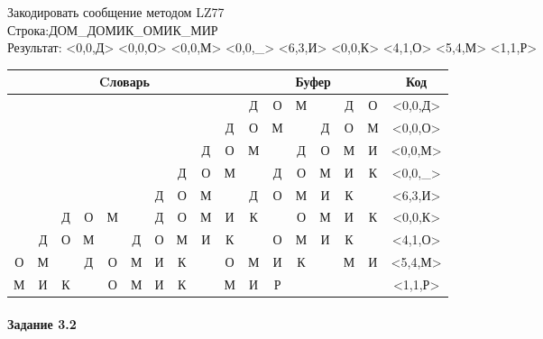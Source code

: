 \documentclass[a4paper, 12pt]{article}
\begin{document}
Закодировать сообщение методом LZ77\\
Строка:ДОМ\_ДОМИК\_ОМИК\_МИР\\
Результат: <0,0,Д> <0,0,О> <0,0,М> <0,0,\_> <6,3,И> <0,0,К> <4,1,О> <5,4,М> <1,1,Р>\\
\begin{table}[h!]
\centering
\begin{tabular}{|c|c|c|c|c|c|c|c|c|c|c|c|c|c|c|c|c|} 
\hline
\multicolumn{10}{|c|}{Cловарь} & \multicolumn{6}{c|}{Буфер} & Код  \\ \hline
  &   &   &   &   &   &   &   &   &   & \cellcolor[HTML]{8CE4F6} Д & О & М &   & Д & О & <0,0,Д>
\\ \hline
  &   &   &   &   &   &   &   &   & Д & \cellcolor[HTML]{8CE4F6} О & М &   & Д & О & М & <0,0,О>
\\ \hline
  &   &   &   &   &   &   &   & Д & О & \cellcolor[HTML]{8CE4F6} М &   & Д & О & М & И & <0,0,М>
\\ \hline
  &   &   &   &   &   &   & Д & О & М & \cellcolor[HTML]{8CE4F6}   & Д & О & М & И & К & <0,0,\_>
\\ \hline
  &   &   &   &   &   & \cellcolor[HTML]{FFFF00} Д & \cellcolor[HTML]{FFFF00} О & \cellcolor[HTML]{FFFF00} М &   & \cellcolor[HTML]{FFFF00} Д & \cellcolor[HTML]{FFFF00} О & \cellcolor[HTML]{FFFF00} М & \cellcolor[HTML]{8CE4F6} И & К &   & <6,3,И>
\\ \hline
  &   & Д & О & М &   & Д & О & М & И & \cellcolor[HTML]{8CE4F6} К &   & О & М & И & К & <0,0,К>
\\ \hline
  & Д & О & М & \cellcolor[HTML]{FFFF00}   & Д & О & М & И & К & \cellcolor[HTML]{FFFF00}   & \cellcolor[HTML]{8CE4F6} О & М & И & К &   & <4,1,О>
\\ \hline
О & М &   & Д & О & \cellcolor[HTML]{FFFF00} М & \cellcolor[HTML]{FFFF00} И & \cellcolor[HTML]{FFFF00} К & \cellcolor[HTML]{FFFF00}   & О & \cellcolor[HTML]{FFFF00} М & \cellcolor[HTML]{FFFF00} И & \cellcolor[HTML]{FFFF00} К & \cellcolor[HTML]{FFFF00}   & \cellcolor[HTML]{8CE4F6} М & И & <5,4,М>
\\ \hline
М & \cellcolor[HTML]{FFFF00} И & К &   & О & М & И & К &   & М & \cellcolor[HTML]{FFFF00} И & \cellcolor[HTML]{8CE4F6} Р &   &   &   &   & <1,1,Р>
\\ \hline
\end{tabular}
\end{table}

\paragraph{Задание 3.2}
\end{document}
